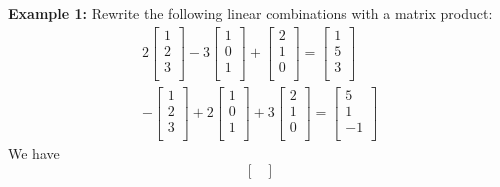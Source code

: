 \documentclass{article}
\begin{document}
\begin{examples}
  \textbf{Example 1:}\newline
  Rewrite the following linear combinations with a matrix product:
  \begin{align*}
    2
    \begin{bmatrix}
      1\\
      2\\
      3\\
    \end{bmatrix}-3
    \begin{bmatrix}
      1\\
      0\\
      1\\
    \end{bmatrix} +
    \begin{bmatrix}
      2\\
      1\\
      0\\
    \end{bmatrix} =
    \begin{bmatrix}
      1\\
      5\\
      3\\
    \end{bmatrix}\\
    -
    \begin{bmatrix}
      1\\
      2\\
      3\\
    \end{bmatrix}
    + 2
    \begin{bmatrix}
      1\\
      0\\
      1\\
    \end{bmatrix} + 3
    \begin{bmatrix}
      2\\
      1\\
      0\\
    \end{bmatrix} =
    \begin{bmatrix}
      5\\
      1\\
      -1\\
    \end{bmatrix}
  \end{align*}
  We have
  \[
    \begin{bmatrix}

\end{bmatrix}\]
\end{examples}
\end{document}
